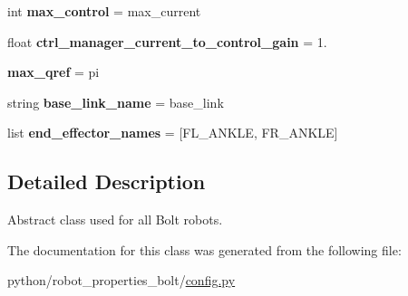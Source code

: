 \begin{DoxyCompactItemize}
\item 
\mbox{\label{classrobot__properties__bolt_1_1config_1_1BoltAbstract_a34b90f440634b8761059d7bb6d1e781a}} 
int {\bfseries max\+\_\+control} = max\+\_\+current
\item 
\mbox{\label{classrobot__properties__bolt_1_1config_1_1BoltAbstract_a66654057aee624d4e9e8024e1f13a508}} 
float {\bfseries ctrl\+\_\+manager\+\_\+current\+\_\+to\+\_\+control\+\_\+gain} = 1.
\item 
\mbox{\label{classrobot__properties__bolt_1_1config_1_1BoltAbstract_a9db1e36360424c48157b8ec3aef70c6d}} 
{\bfseries max\+\_\+qref} = pi
\item 
\mbox{\label{classrobot__properties__bolt_1_1config_1_1BoltAbstract_aee1c823623d5dbd60fff89fdc510650b}} 
string {\bfseries base\+\_\+link\+\_\+name} = \textquotesingle{}base\+\_\+link\textquotesingle{}
\item 
\mbox{\label{classrobot__properties__bolt_1_1config_1_1BoltAbstract_a21c485748b5e683b6e39c8b9f2ec83df}} 
list {\bfseries end\+\_\+effector\+\_\+names} = \mbox{[}\textquotesingle{}F\+L\+\_\+\+A\+N\+K\+LE\textquotesingle{}, \textquotesingle{}F\+R\+\_\+\+A\+N\+K\+LE\textquotesingle{}\mbox{]}
\end{DoxyCompactItemize}


\subsection{Detailed Description}
Abstract class used for all Bolt robots. 



The documentation for this class was generated from the following file\+:\begin{DoxyCompactItemize}
\item 
python/robot\+\_\+properties\+\_\+bolt/\hyperlink{config_8py}{config.\+py}\end{DoxyCompactItemize}
